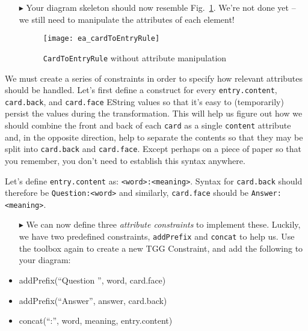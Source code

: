 \begin{enumerate}
\vspace{0.5cm}

\item[$\blacktriangleright$] Your diagram skeleton should now resemble Fig.~\ref{fig:cardtoentry_1}. We're not done yet -- we still need to manipulate the
attributes of each element!

\newpage

  \begin{figure}[htbp]
  \begin{center}
    \texttt{[image: ea\_cardToEntryRule]}
    \caption{\texttt{CardToEntryRule} without attribute manipulation}
    \label{fig:cardtoentry_1}
  \end{center}
  \end{figure}

\end{enumerate}

We must create a series of constraints in order to specify how relevant attributes should be handled. Let's first define a construct for every
\texttt{entry.content}, \texttt{card.back}, and \texttt{card.face} EString values so that it's easy to (temporarily) persist the values during the
transformation. This will help us figure out how we should combine the front and back of each \texttt{card} as a single \texttt{content} attribute and,
in the opposite direction, help to separate the contents so that they may be split into \texttt{card.back} and \texttt{card.face}. Except
perhaps on a piece of paper so that you remember, you don't need to establish this syntax anywhere. 

Let's define \texttt{entry.content} as: \texttt{<word>:<meaning>}.  Syntax for \texttt{card.back} should therefore be \texttt{Question:<word>} and
similarly, \texttt{card.face} should be \texttt{Answer:<meaning>}. 


\begin{itemize}

\item[$\blacktriangleright$] We can now define three \emph{attribute constraints} to implement these. Luckily, we have two predefined constraints, \texttt{addPrefix} and
\texttt{concat} to help us. Use the toolbox again to create a new TGG Constraint, and add the following to your diagram:

  \item addPrefix(``Question '', word, card.face)
  \item addPrefix(``Answer'', answer, card.back)
  \item concat(``:'', word, meaning, entry.content)
  
\end{itemize}

